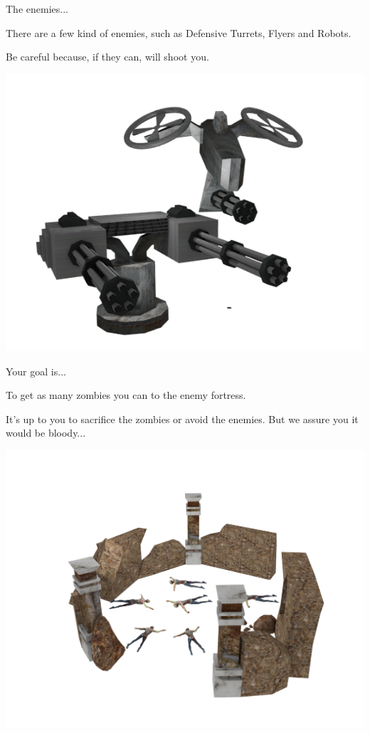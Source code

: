\documentclass[10pt]{beamer}
\begin{document}
	\begin{frame}{The enemies...}

	   \vspace{1cm}
	   There are a few kind of enemies, such as Defensive Turrets, Flyers and Robots.
	   \newline
	    
	   Be careful because, if they can, will shoot you.
	  \begin{center}
	  \includegraphics[scale=0.7]{enemies.png}
	  \end{center}
	\end{frame}

	\begin{frame}{Your goal is...}

	   \vspace{1cm}
	   To get as many zombies you can to the enemy fortress.
	   \newline
	    
	   It's up to you to sacrifice the zombies or avoid the enemies. But we assure you it would be bloody...
	  \begin{center}
	  \includegraphics[scale=0.4]{goal.png}
	  \end{center}
	\end{frame}
\end{document}
